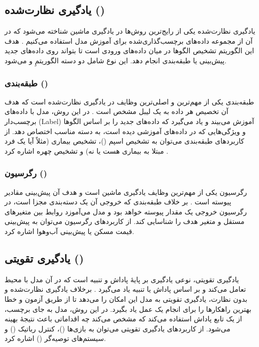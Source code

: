 \subsection{یادگیری نظارت‌شده ()}
یادگیری نظارت‌شده یکی از رایج‌ترین روش‌ها در یادگیری ماشین شناخته می‌شود که در آن از مجموعه داده‌های برچسب‌گذاری‌شده برای آموزش مدل استفاده می‌کنیم
\cite{james2013introduction}. هدف این الگوریتم تشخیص الگوها در میان داده‌های ورودی است تا بتواند روی داده‌های جدید پیش‌بینی یا طبقه‌بندی انجام دهد. این نوع شامل دو دسته الگوریتمِ  و  می‌شود.

\subsubsection{طبقه‌بندی ()}
طبقه‌بندی یکی از مهم‌ترین و اصلی‌ترین وظایف در یادگیری نظارت‌شده است که هدف آن تخصیص هر داده به یک لیبل مشخص است
\cite{bishop2006pattern}.
در این روش، مدل با داده‌های برچسب‌دار (Label) آموزش می‌بیند و یاد می‌گیرد که داده‌های جدید را بر اساس الگوها و ویژگی‌هایی که در داده‌های آموزشی دیده است، به دسته مناسب اختصاص دهد. از کاربردهای طبقه‌بندی می‌توان به تشخیص اسپم ()، تشخیص بیماری (مثلاً آیا یک فرد مبتلا به بیماری هست یا نه) و تشخیص چهره اشاره کرد
\cite{murphy2012machine}.

\subsubsection{رگرسیون ()}
رگرسیون یکی از مهم‌ترین وظایف یادگیری ماشین است و هدف آن پیش‌بینی مقادیر پیوسته است
\cite{montgomery2021introduction}. بر خلاف طبقه‌بندی که خروجی آن یک دسته‌بندی مجزا است، در رگرسیون خروجی یک مقدار پیوسته خواهد بود و مدل می‌آموزد روابط بین متغیرهای مستقل و متغیر هدف را شناسایی کند. از کاربردهای رگرسیون می‌توان به پیش‌بینی قیمت مسکن یا پیش‌بینی آب‌وهوا اشاره کرد.

\subsection{یادگیری تقویتی ()}
یادگیری تقویتی، نوعی یادگیری بر پایهٔ پاداش و تنبیه است که در آن مدل با محیط تعامل می‌کند و بر اساس پاداش یا تنبیه یاد می‌گیرد
\cite{sutton2018reinforcement}.
برخلاف یادگیری نظارت‌شده و بدون نظارت، یادگیری تقویتی به مدل این امکان را می‌دهد تا از طریق آزمون و خطا بهترین راهکارها را برای انجام یک عمل یاد بگیرد. در این روش، مدل به جای برچسب، از یک تابع پاداش استفاده می‌کند که مشخص می‌کند چه اقداماتی باعث نتیجهٔ بهینه می‌شود. از کاربردهای یادگیری تقویتی می‌توان به بازی‌ها ()، کنترل رباتیک () و سیستم‌های توصیه‌گر () اشاره کرد.


